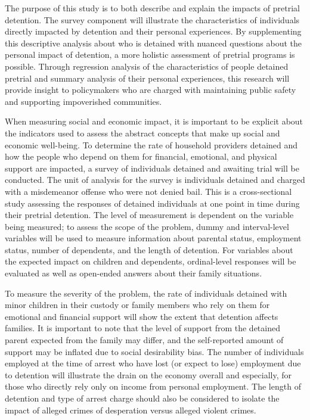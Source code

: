 \documentclass[
  letterpaper,
  DIV=11,
  numbers=noendperiod]{scrartcl}
\begin{document}
The purpose of this study is to both describe and explain the impacts of
pretrial detention. The survey component will illustrate the
characteristics of individuals directly impacted by detention and their
personal experiences. By supplementing this descriptive analysis about
who is detained with nuanced questions about the personal impact of
detention, a more holistic assessment of pretrial programs is possible.
Through regression analysis of the characteristics of people detained
pretrial and summary analysis of their personal experiences, this
research will provide insight to policymakers who are charged with
maintaining public safety and supporting impoverished communities.

When measuring social and economic impact, it is important to be
explicit about the indicators used to assess the abstract concepts that
make up social and economic well-being. To determine the rate of
household providers detained and how the people who depend on them for
financial, emotional, and physical support are impacted, a survey of
individuals detained and awaiting trial will be conducted. The unit of
analysis for the survey is individuals detained and charged with a
misdemeanor offense who were not denied bail. This is a cross-sectional
study assessing the responses of detained individuals at one point in
time during their pretrial detention. The level of measurement is
dependent on the variable being measured; to assess the scope of the
problem, dummy and interval-level variables will be used to measure
information about parental status, employment status, number of
dependents, and the length of detention. For variables about the
expected impact on children and dependents, ordinal-level responses will
be evaluated as well as open-ended answers about their family
situations.

To measure the severity of the problem, the rate of individuals detained
with minor children in their custody or family members who rely on them
for emotional and financial support will show the extent that detention
affects families. It is important to note that the level of support from
the detained parent expected from the family may differ, and the
self-reported amount of support may be inflated due to social
desirability bias. The number of individuals employed at the time of
arrest who have lost (or expect to lose) employment due to detention
will illustrate the drain on the economy overall and especially, for
those who directly rely only on income from personal employment. The
length of detention and type of arrest charge should also be considered
to isolate the impact of alleged crimes of desperation versus alleged
violent crimes.
\end{document}
